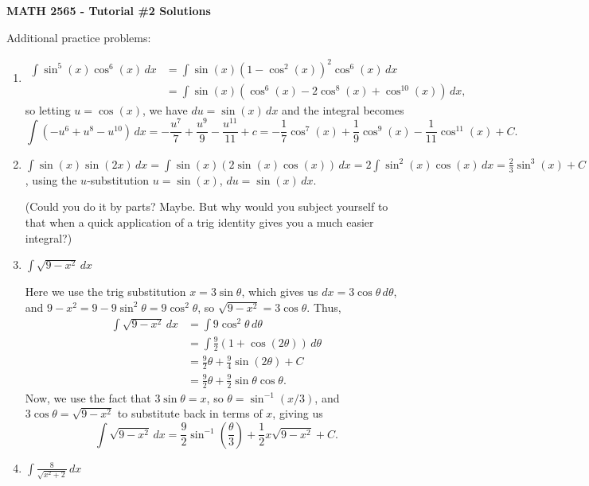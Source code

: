 \documentclass[12pt]{article}
\newcommand{\di}{\displaystyle}
\begin{document}
\author{Instructor: Sean Fitzpatrick}
\thispagestyle{empty}
\begin{center}
{\bf MATH 2565 - Tutorial \#2 Solutions}
\end{center}

Additional practice problems:

\begin{enumerate}
  \item  \begin{align*}
\int \sin^5(x)\cos^6(x)\,dx &= \int \sin(x)(1-\cos^2(x))^2\cos^6(x)\,dx\\& = \int \sin(x)(\cos^6(x)-2\cos^8(x)+\cos^{10}(x))\,dx, 
       \end{align*}
so letting $u=\cos(x)$, we have $du =\sin (x)\,dx$        and the integral becomes
\[
 \int(-u^6+u^8-u^{10})\,dx = -\frac{u^7}{7}+\frac{u^9}{9}-\frac{u^{11}}{11} +c = -\frac{1}{7}\cos^7(x)+\frac{1}{9}\cos^9(x)-\frac{1}{11}\cos^{11}(x)+C.
\]

 \item $\di \int \sin(x)\sin(2x)\,dx = \int \sin(x)(2\sin(x)\cos(x))\,dx = 2\int \sin^2(x)\cos(x)\,dx = \frac{2}{3}\sin^{3}(x)+C$, using the $u$-substitution $u=\sin(x)$, $du = \sin(x)\,dx$.
 
 (Could you do it by parts? Maybe. But why would you subject yourself to that when a quick application of a trig identity gives you a much easier integral?)

  \item $\di \int \sqrt{9-x^2}\,dx$ 
  
  Here we use the trig substitution $x=3\sin\theta$, which gives us $dx = 3\cos\theta\,d\theta$, and $9-x^2 = 9-9\sin^2\theta = 9\cos^2\theta$, so $\sqrt{9-x^2} = 3\cos\theta$. Thus,
 \begin{align*}
 \int \sqrt{9-x^2}\,dx & = \int 9\cos^2\theta\,d\theta\\
 & = \int \frac{9}{2}(1+\cos(2\theta))\,d\theta\\
 & = \frac{9}{2}\theta + \frac{9}{4}\sin(2\theta)+C\\
 & = \frac{9}{2}\theta + \frac{9}{2}\sin\theta\cos\theta.
 \end{align*}
 Now, we use the fact that $3\sin\theta = x$, so $\theta = \sin^{-1}(x/3)$, and $3\cos\theta = \sqrt{9-x^2}$ to substitute back in terms of $x$, giving us
 \[
 \int \sqrt{9-x^2}\,dx = \frac{9}{2}\sin^{-1}\left(\frac{\theta}{3}\right)+\frac{1}{2}x\sqrt{9-x^2}+C.
 \]
\pagebreak

 \item $\di \int \frac{8}{\sqrt{x^2+2}}\,dx$
 

\end{enumerate}
\end{document}
